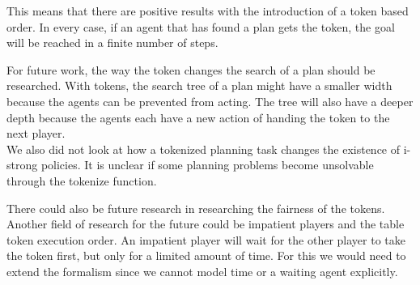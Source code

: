 This means that there are positive results with the introduction of a token based order. In every case, if an agent that has found a plan gets the token, the goal will be reached in a finite number of steps.

For future work, the way the token changes the search of a plan should be researched. With tokens, the search tree of a plan might have a smaller width because the agents can be prevented from acting. The tree will also have a deeper depth because the agents each have a new action of handing the token to the next player.\\
We also did not look at how a tokenized planning task changes the existence of i-strong policies. It is unclear if some planning problems become unsolvable through the tokenize function.

There could also be future research in researching the fairness of the tokens.\\
Another field of research for the future could be impatient players and the table token execution order. An impatient player will wait for the other player to take the token first, but only for a limited amount of time. For this we would need to extend the formalism since we cannot model time or a waiting agent explicitly.
